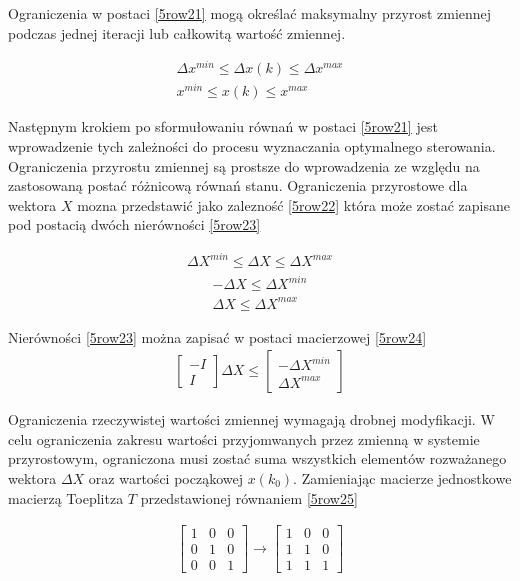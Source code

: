 Ograniczenia w postaci \ref{5row21} mogą określać maksymalny przyrost zmiennej podczas jednej iteracji lub całkowitą wartość zmiennej. 

\begin{gather}
\label{5row21}
 \Delta x^{min} \leq \Delta x(k) \leq \Delta x^{max}\\
\nonumber  x^{min} \leq  x(k) \leq  x^{max}
\end{gather}

Następnym krokiem po sformułowaniu równań w postaci \ref{5row21} jest wprowadzenie tych zależności do procesu wyznaczania optymalnego sterowania. Ograniczenia przyrostu zmiennej są prostsze do wprowadzenia ze względu na zastosowaną postać różnicową równań stanu. Ograniczenia przyrostowe dla wektora $X$ mozna przedstawić jako zalezność \ref{5row22} która może zostać zapisane pod postacią dwóch nierówności \ref{5row23}

\begin{gather}
\label{5row22}
\Delta X^{min} \leq \Delta X \leq \Delta X^{max}
\end{gather}
\begin{gather}
\label{5row23}
-\Delta X \leq \Delta X^{min} \\
\nonumber \Delta X \leq \Delta X^{max}
\end{gather}

Nierówności \ref{5row23} można zapisać w postaci macierzowej \ref{5row24}
\begin{gather}
\label{5row24}
\begin{bmatrix} - I \\ I \end{bmatrix} \Delta X \leq \begin{bmatrix} - \Delta X^{min} \\ \Delta X^{max} \end{bmatrix}
\end{gather}

Ograniczenia rzeczywistej wartości zmiennej wymagają drobnej modyfikacji. W celu ograniczenia zakresu wartości przyjomwanych przez zmienną w systemie przyrostowym, ograniczona musi zostać suma wszystkich elementów rozważanego wektora $\Delta X$ oraz wartości począkowej $x(k_0)$. Zamieniając macierze jednostkowe macierzą Toeplitza $T$ przedstawionej równaniem \ref{5row25}

\begin{gather}
\label{5row25}
\begin{bmatrix} 1 & 0 & 0 \\ 0 & 1 & 0 \\ 0 & 0 & 1 \end{bmatrix} \longrightarrow  \begin{bmatrix} 1 & 0 & 0 \\ 1 & 1 & 0 \\ 1 & 1 & 1 \end{bmatrix}
\end{gather}

